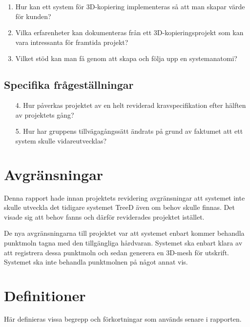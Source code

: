 \begin{enumerate}
	\item Hur kan ett system för 3D-kopiering implementeras så att man skapar värde för kunden?
	\item Vilka erfarenheter kan dokumenteras från ett 3D-kopieringsprojekt som kan vara intressanta för framtida projekt?
	\item Vilket stöd kan man få genom att skapa och följa upp en systemanatomi?
\end{enumerate}
	
\subsection{Specifika frågeställningar}

\begin{enumerate}
	\item [4.] Hur påverkas projektet av en helt reviderad kravspecifikation efter hälften av projektets gång?
	\item [5.] Hur har gruppens tillvägagångssätt ändrats på grund av faktumet att ett system skulle vidareutvecklas? 
	
\end{enumerate}

\section{Avgränsningar}
\label{sec:delimitations}
Denna rapport hade innan projektets revidering avgränsningar att systemet inte skulle utveckla det tidigare systemet TreeD även om behov skulle finnas. Det visade sig att behov fanns och därför reviderades projektet istället.

De nya avgränsningarna till projektet var att systemet enbart kommer behandla punktmoln tagna med den tillgängliga hårdvaran. Systemet ska enbart klara av att registrera dessa punktmoln och sedan generera en 3D-mesh för utskrift. Systemet ska inte behandla punktmolnen på något annat vis.

\section{Definitioner}
\label{sec:definitions}
Här definieras vissa begrepp och förkortningar som används senare i rapporten.

